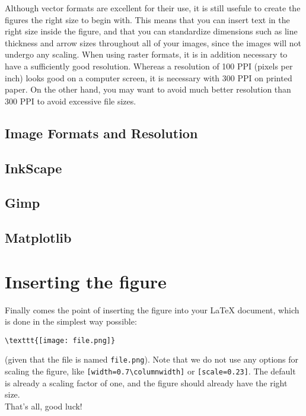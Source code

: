 \documentclass[12pt,a4paper]{article}
\begin{document}
Although vector formats are excellent for their use, it is still usefule to create the figures the right size to begin with. This means that you can insert text in the right size inside the figure, and that you can standardize dimensions such as line thickness and arrow sizes throughout all of your images, since the images will not undergo any scaling.
When using raster formats, it is in addition necessary to have a sufficiently good resolution.
Whereas a resolution of 100 PPI (pixels per inch) looks good on a computer screen, it is necessary with 300 PPI on printed paper.
On the other hand, you may want to avoid much better resolution than 300 PPI to avoid excessive file sizes.

\subsection{Image Formats and Resolution}
\subsection{InkScape}
\subsection{Gimp}
\subsection{Matplotlib}

\section{Inserting the figure}
Finally comes the point of inserting the figure into your \LaTeX{} document, which is done in the simplest way possible:

\begin{verbatim}
\texttt{[image: file.png]}
\end{verbatim}
(given that the file is named \verb|file.png|). Note that we do not use any options for scaling the figure, like \verb|[width=0.7\columnwidth]| or \verb|[scale=0.23]|. The default is already a scaling factor of one, and the figure should already have the right size.
\\

That's all, good luck!
\end{document}
